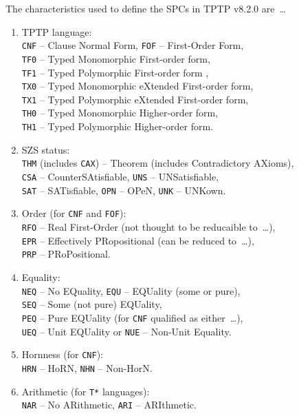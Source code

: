 \documentclass[runningheads]{llncs}
\begin{document}
The characteristics used to define the SPCs in TPTP v8.2.0 are~\ldots
\begin{enumerate}
\item TPTP language: \\
      {\tt CNF} -- Clause Normal Form,
      {\tt FOF} -- First-Order Form, \\
      {\tt TF0} -- Typed Monomorphic First-order form, \\
      {\tt TF1} -- Typed Polymorphic First-order form , \\
      {\tt TX0} -- Typed Monomorphic eXtended First-order form, \\
      {\tt TX1} -- Typed Polymorphic eXtended First-order form, \\
      {\tt TH0} -- Typed Monomorphic Higher-order form, \\
      {\tt TH1} -- Typed Polymorphic Higher-order form.
\item SZS status: \\
      {\tt THM} (includes {\tt CAX}) -- Theorem (includes Contradictory AXioms), \\
      {\tt CSA} -- CounterSAtisfiable,
      {\tt UNS} -- UNSatisfiable, \\
      {\tt SAT} -- SATisfiable,
      {\tt OPN} -- OPeN, 
      {\tt UNK} -- UNKown.
\item Order (for {\tt CNF} and {\tt FOF}): \\
      {\tt RFO} -- Real First-Order (not thought to be reducaible to~\ldots),\\
      {\tt EPR} -- Effectively PRopositional (can be reduced to~\ldots),\\
      {\tt PRP} -- PRoPositional.
\item Equality: \\
      {\tt NEQ} -- No EQuality,
      {\tt EQU} -- EQUality (some or pure), \\
      {\tt SEQ} -- Some (not pure) EQUality, \\
      {\tt PEQ} -- Pure EQUality (for {\tt CNF} qualified as either~\ldots),\\
      {\tt UEQ} -- Unit EQUality or
      {\tt NUE} -- Non-Unit Equality.
\item Hornness (for {\tt CNF}): \\
      {\tt HRN} -- HoRN,
      {\tt NHN} -- Non-HorN.
\item Arithmetic (for {\tt T*} languages): \\
      {\tt NAR} -- No ARithmetic,
      {\tt ARI} -- ARIthmetic.
\end{enumerate}
\end{document}
